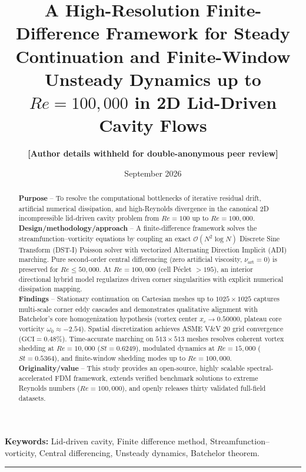\documentclass[11pt,a4paper]{article}
\title{\LARGE \textbf{A High-Resolution Finite-Difference Framework for Steady Continuation and Finite-Window Unsteady Dynamics up to $Re = 100{,}000$ in 2D Lid-Driven Cavity Flows}}
\author{\textbf{[Author details withheld for double-anonymous peer review]}}
\date{September 2026}
\begin{document}
\maketitle

\begin{abstract}
\noindent\textbf{Purpose} -- To resolve the computational bottlenecks of iterative residual drift, artificial numerical dissipation, and high-Reynolds divergence in the canonical 2D incompressible lid-driven cavity problem from $Re = 100$ up to $Re = 100{,}000$. \\[0.4em]
\noindent\textbf{Design/methodology/approach} -- A finite-difference framework solves the streamfunction--vorticity equations by coupling an exact $\mathcal{O}(N^2 \log N)$ Discrete Sine Transform (DST-I) Poisson solver with vectorized Alternating Direction Implicit (ADI) marching. Pure second-order central differencing (zero artificial viscosity, $\nu_{\mathrm{art}} = 0$) is preserved for $Re \le 50{,}000$. At $Re = 100{,}000$ (cell P\'eclet $> 195$), an interior directional hybrid model regularizes driven corner singularities with explicit numerical dissipation mapping. \\[0.4em]
\noindent\textbf{Findings} -- Stationary continuation on Cartesian meshes up to $1025 \times 1025$ captures multi-scale corner eddy cascades and demonstrates qualitative alignment with Batchelor's core homogenization hypothesis (vortex center $x_c \to 0.50000$, plateau core vorticity $\omega_0 \approx -2.54$). Spatial discretization achieves ASME V\&V 20 grid convergence ($\mathrm{GCI} = 0.48\%$). Time-accurate marching on $513 \times 513$ meshes resolves coherent vortex shedding at $Re = 10{,}000$ ($St = 0.6249$), modulated dynamics at $Re = 15{,}000$ ($St = 0.5364$), and finite-window shedding modes up to $Re = 100{,}000$. \\[0.4em]
\noindent\textbf{Originality/value} -- This study provides an open-source, highly scalable spectral-accelerated FDM framework, extends verified benchmark solutions to extreme Reynolds numbers ($Re = 100{,}000$), and openly releases thirty validated full-field datasets.
\end{abstract}

\vspace{0.5em}
\noindent \textbf{Keywords:} Lid-driven cavity, Finite difference method, Streamfunction--vorticity, Central differencing, Unsteady dynamics, Batchelor theorem.

\vspace{1em}
\hrule
\vspace{1em}
\end{document}
